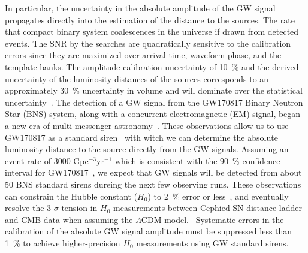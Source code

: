 \documentclass[%
 reprint,
superscriptaddress,
 amsmath,amssymb,
 aps,
]{revtex4-1}
\begin{document}
In particular, the uncertainty in the absolute amplitude of the GW signal
propagates directly into the estimation of the distance to the sources. 
The rate that compact binary system coalescences in the universe if drawn from detected events. The SNR by the searches are quadratically sensitive to the calibration errors since they are maximized over arrival time, waveform phase, and the template banks. The amplitude calibration uncertainty of 10~\% and the derived uncertainty of the luminosity distances of the sources corresponds to an approximately 30~\% uncertainty in volume and will dominate over the statistical uncertainty~\cite{2041-8205-833-1-L1}.
The detection of a GW signal from the GW170817 Binary Neutron Star (BNS) system, along with a concurrent electromagnetic (EM) signal, began a new era of multi-messenger astronomy~\cite{PhysRevLett.119.161101}. These observations 
allow us to use GW170817 as a standard 
siren~\cite{Abbott:2017xzu,Schutz_1986,Holz_2005,Nissanke_2010} with witch we can 
determine the absolute luminosity distance to the source directly from the 
GW signals. Assuming an event rate of 3000 Gpc$^{-3}$yr$^{-1}$ 
which is consistent with the 90~\% 
confidence interval for GW170817~\cite{PhysRevLett.119.161101}, 
we expect that GW signals will be detected from about 
50 BNS standard sirens dureing the next few observing runs. 
These observations can constrain the Hubble constant ($H_0$) to 2~\% error or less~\cite{Feeney:2018mkj}, and eventually resolve 
the 3-$\sigma$ tension in $H_0$ measurements between Cephied-SN distance 
ladder~\cite{Riess_2016} and CMB data when assuming the $\Lambda$CDM 
model.~\cite{2016-planck} Systematic errors in the calibration of 
the absolute GW signal amplitude must be suppressed less than 1~\% to 
achieve higher-precision $H_0$ measurements using GW standard sirens.


\end{document}
